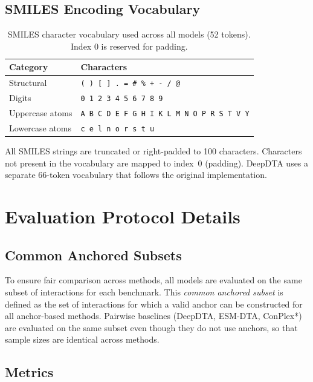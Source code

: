 \documentclass[11pt]{article}
\begin{document}
\subsection{SMILES Encoding Vocabulary}

\begin{table}[h]
\centering
\caption{SMILES character vocabulary used across all models (52 tokens). Index 0 is reserved for padding.}
\label{tab:smiles_vocab}
\small
\begin{tabular}{ll}
\toprule
Category & Characters \\
\midrule
Structural & \texttt{( ) [ ] . = \# \% + - / @} \\
Digits & \texttt{0 1 2 3 4 5 6 7 8 9} \\
Uppercase atoms & \texttt{A B C D E F G H I K L M N O P R S T V Y} \\
Lowercase atoms & \texttt{c e l n o r s t u} \\
\bottomrule
\end{tabular}
\end{table}

All SMILES strings are truncated or right-padded to 100 characters. Characters not present in the vocabulary are mapped to index~0 (padding). DeepDTA uses a separate 66-token vocabulary that follows the original implementation.

\section{Evaluation Protocol Details}
\label{sec:eval_details}

\subsection{Common Anchored Subsets}

To ensure fair comparison across methods, all models are evaluated on the same subset of interactions for each benchmark. This \emph{common anchored subset} is defined as the set of interactions for which a valid anchor can be constructed for all anchor-based methods. Pairwise baselines (DeepDTA, ESM-DTA, ConPlex*) are evaluated on the same subset even though they do not use anchors, so that sample sizes are identical across methods.

\subsection{Metrics}
\end{document}
